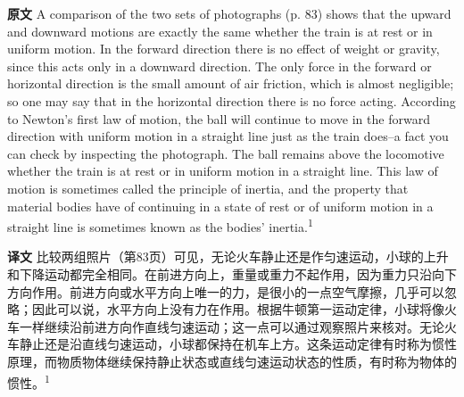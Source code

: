 \documentclass[UTF8,zihao=-4]{ctexart}
\begin{document}
\noindent\textbf{原文} A comparison of the two sets of photographs (p. 83) shows that the upward and downward motions are exactly the same whether the train is at rest or in uniform motion. In the forward direction there is no effect of weight or gravity, since this acts only in a downward direction. The only force in the forward or horizontal direction is the small amount of air friction, which is almost negligible; so one may say that in the horizontal direction there is no force acting. According to Newton's first law of motion, the ball will continue to move in the forward direction with uniform motion in a straight line just as the train does--a fact you can check by inspecting the photograph. The ball remains above the locomotive whether the train is at rest or in uniform motion in a straight line. This law of motion is sometimes called the principle of inertia, and the property that material bodies have of continuing in a state of rest or of uniform motion in a straight line is sometimes known as the bodies' inertia.\textsuperscript{1}
\par\noindent\textbf{译文} 比较两组照片（第83页）可见，无论火车静止还是作匀速运动，小球的上升和下降运动都完全相同。在前进方向上，重量或重力不起作用，因为重力只沿向下方向作用。前进方向或水平方向上唯一的力，是很小的一点空气摩擦，几乎可以忽略；因此可以说，水平方向上没有力在作用。根据牛顿第一运动定律，小球将像火车一样继续沿前进方向作直线匀速运动；这一点可以通过观察照片来核对。无论火车静止还是沿直线匀速运动，小球都保持在机车上方。这条运动定律有时称为惯性原理，而物质物体继续保持静止状态或直线匀速运动状态的性质，有时称为物体的惯性。\textsuperscript{1}
\medskip
\end{document}
